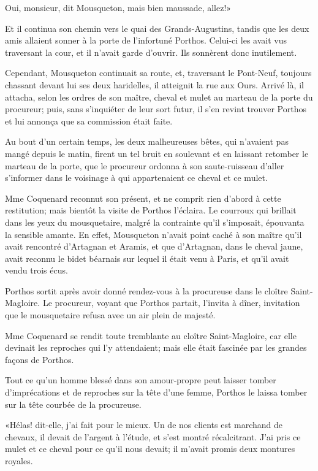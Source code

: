 \speak  Oui, monsieur, dit Mousqueton, mais bien maussade, allez!» 

Et il continua son chemin vers le quai des Grands-Augustins, tandis que les deux amis allaient sonner à la porte de l'infortuné Porthos. Celui-ci les avait vus traversant la cour, et il n'avait garde d'ouvrir. Ils sonnèrent donc inutilement. 

Cependant, Mousqueton continuait sa route, et, traversant le Pont-Neuf, toujours chassant devant lui ses deux haridelles, il atteignit la rue aux Ours. Arrivé là, il attacha, selon les ordres de son maître, cheval et mulet au marteau de la porte du procureur; puis, sans s'inquiéter de leur sort futur, il s'en revint trouver Porthos et lui annonça que sa commission était faite. 

Au bout d'un certain temps, les deux malheureuses bêtes, qui n'avaient pas mangé depuis le matin, firent un tel bruit en soulevant et en laissant retomber le marteau de la porte, que le procureur ordonna à son saute-ruisseau d'aller s'informer dans le voisinage à qui appartenaient ce cheval et ce mulet. 

Mme Coquenard reconnut son présent, et ne comprit rien d'abord à cette restitution; mais bientôt la visite de Porthos l'éclaira. Le courroux qui brillait dans les yeux du mousquetaire, malgré la contrainte qu'il s'imposait, épouvanta la sensible amante. En effet, Mousqueton n'avait point caché à son maître qu'il avait rencontré d'Artagnan et Aramis, et que d'Artagnan, dans le cheval jaune, avait reconnu le bidet béarnais sur lequel il était venu à Paris, et qu'il avait vendu trois écus. 

Porthos sortit après avoir donné rendez-vous à la procureuse dans le cloître Saint-Magloire. Le procureur, voyant que Porthos partait, l'invita à dîner, invitation que le mousquetaire refusa avec un air plein de majesté. 

Mme Coquenard se rendit toute tremblante au cloître Saint-Magloire, car elle devinait les reproches qui l'y attendaient; mais elle était fascinée par les grandes façons de Porthos. 

Tout ce qu'un homme blessé dans son amour-propre peut laisser tomber d'imprécations et de reproches sur la tête d'une femme, Porthos le laissa tomber sur la tête courbée de la procureuse. 

«Hélas! dit-elle, j'ai fait pour le mieux. Un de nos clients est marchand de chevaux, il devait de l'argent à l'étude, et s'est montré récalcitrant. J'ai pris ce mulet et ce cheval pour ce qu'il nous devait; il m'avait promis deux montures royales. 

